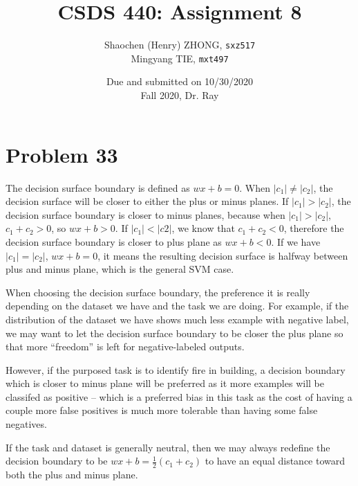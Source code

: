\documentclass[12pt]{article}
\newcommand{\ilcode}{\texttt}
\begin{document}
\title{\textbf{CSDS 440: Assignment 8}}

\author{Shaochen (Henry) ZHONG, \ilcode{sxz517} \\ Mingyang TIE, \ilcode{mxt497}}
\date{Due and submitted on 10/30/2020 \\ Fall 2020, Dr. Ray}
\maketitle


\section{Problem 33}

The decision surface boundary is defined as $wx + b = 0$. When $|c_1| \neq |c_2|$, the decision surface will be closer to either the plus or minus planes. If $|c_1| > |c_2|$, the decision surface boundary is closer to minus planes, because when $|c_1| > |c_2|$, $c_1 + c_2 > 0$, so $wx + b > 0$. If $|c_1| < |c2|$, we know that $c_1 + c_2 < 0$, therefore the decision surface boundary is closer to plus plane as $wx + b < 0$. If we have $|c_1| = |c_2|$, $wx + b = 0$, it means the resulting decision surface is halfway between plus and minus plane, which is the general SVM case. \newline

When choosing the decision surface boundary, the preference it is really depending on the dataset we have and the task we are doing. For example, if the distribution of the dataset we have shows much less example with negative label, we may want to let the decision surface boundary to be closer the plus plane so that more ``freedom'' is left for negative-labeled outputs.

However, if the purposed task is to identify fire in building, a decision boundary which is closer to minus plane will be preferred as it more examples will be classifed as positive -- which is a preferred bias in this task as the cost of having a couple more false positives is much more tolerable than having some false negatives.

If the task and dataset is generally neutral, then we may always redefine the decision boundary to be $wx + b = \frac{1}{2}(c_1 + c_2)$ to have an equal distance toward both the plus and minus plane.
\end{document}
